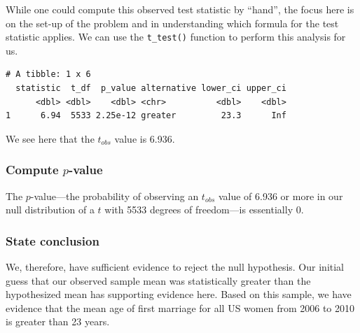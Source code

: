 \documentclass[12pt, krantz2,]{krantz}
\makeatletter
\newenvironment{Shaded}{\begin{snugshade}}{\end{snugshade}}
\newcommand{\DataTypeTok}[1]{\textcolor[rgb]{0.27,0.27,0.27}{#1}}
\newcommand{\DecValTok}[1]{\textcolor[rgb]{0.06,0.06,0.06}{#1}}
\newcommand{\KeywordTok}[1]{\textcolor[rgb]{0.27,0.27,0.27}{\textbf{#1}}}
\newcommand{\NormalTok}[1]{#1}
\newcommand{\OperatorTok}[1]{\textcolor[rgb]{0.43,0.43,0.43}{\textbf{#1}}}
\newcommand{\OtherTok}[1]{\textcolor[rgb]{0.37,0.37,0.37}{#1}}
\newcommand{\StringTok}[1]{\textcolor[rgb]{0.5,0.5,0.5}{#1}}
\newenvironment{kframe}{%
\medskip{}
\setlength{\fboxsep}{.8em}
 \def\at@end@of@kframe{}%
 \ifinner\ifhmode%
  \def\at@end@of@kframe{\end{minipage}}%
  \begin{minipage}{\columnwidth}%
 \fi\fi%
 \def\FrameCommand##1{\hskip\@totalleftmargin \hskip-\fboxsep
 \colorbox{shadecolor}{##1}\hskip-\fboxsep
     \hskip-\linewidth \hskip-\@totalleftmargin \hskip\columnwidth}%
 \MakeFramed {\advance\hsize-\width
   \@totalleftmargin\z@ \linewidth\hsize
   \@setminipage}}%
 {\par\unskip\endMakeFramed%
 \at@end@of@kframe}
\renewenvironment{Shaded}{\begin{kframe}}{\end{kframe}}
\makeatother
\begin{document}
While one could compute this observed test statistic by ``hand'', the focus here is on the set-up of the problem and in understanding which formula for the test statistic applies. We can use the \texttt{t\_test()} function to perform this analysis for us.

\begin{Shaded}
\end{Shaded}

\begin{verbatim}
# A tibble: 1 x 6
  statistic  t_df  p_value alternative lower_ci upper_ci
      <dbl> <dbl>    <dbl> <chr>          <dbl>    <dbl>
1      6.94  5533 2.25e-12 greater         23.3      Inf
\end{verbatim}

We see here that the \(t_{obs}\) value is 6.936.

\hypertarget{compute-p-value}{%
\subsubsection*{\texorpdfstring{Compute \(p\)-value}{Compute p-value}}\label{compute-p-value}}


The \(p\)-value---the probability of observing an \(t_{obs}\) value of 6.936 or more in our null distribution of a \(t\) with 5533 degrees of freedom---is essentially 0.

\hypertarget{state-conclusion}{%
\subsubsection*{State conclusion}\label{state-conclusion}}


We, therefore, have sufficient evidence to reject the null hypothesis. Our initial guess that our observed sample mean was statistically greater than the hypothesized mean has supporting evidence here. Based on this sample, we have evidence that the mean age of first marriage for all US women from 2006 to 2010 is greater than 23 years.
\end{document}
